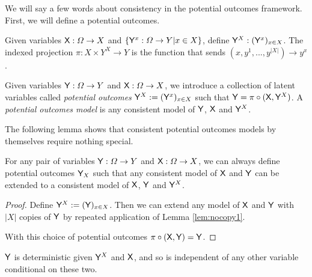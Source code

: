 
We will say a few words about consistency in the potential outcomes framework. First, we will define a potential outcomes.


\begin{definition}[Projection]
Given variables $\mathsf{X}:\Omega\to X$ and $\{\mathsf{Y}^x:\Omega\to Y|x\in X\}$, define $\mathsf{Y}^X:(\mathsf{Y}^x)_{x\in X}$. The indexed projection $\pi:X\times Y^X\to Y$ is the function that sends $(x,y^1,...,y^{|X|})\to y^x$.
\end{definition}

\begin{definition}\label{def:potential_outcomes}
Given variables $\mathsf{Y}:\Omega\to Y$ and $\mathsf{X}:\Omega\to X$, we introduce a collection of latent variables called \emph{potential outcomes} $\mathsf{Y}^X:=(\mathsf{Y}^x)_{x\in X}$ such that $\mathsf{Y} = \pi\circ(\mathsf{X},\mathsf{Y}^X)$. A \emph{potential outcomes model} is any consistent model of $\mathsf{Y}$, $\mathsf{X}$ and $\mathsf{Y}^X$.
\end{definition}

The following lemma shows that consistent potential outcomes models by themselves require nothing special.

\begin{lemma}\label{lem:po_triviality}
For any pair of variables $\mathsf{Y}:\Omega\to Y$ and $\mathsf{X}:\Omega\to X$, we can always define potential outcomes $\mathsf{Y}_X$ such that any consistent model of $\mathsf{X}$ and $\mathsf{Y}$ can be extended to a consistent model of $\mathsf{X}$, $\mathsf{Y}$ and $\mathsf{Y}^X$.
\end{lemma}

\begin{proof}
Define $\mathsf{Y}^X:=(\mathsf{Y})_{x\in X}$. Then we can extend any model of $\mathsf{X}$ and $\mathsf{Y}$ with $|X|$ copies of $\mathsf{Y}$ by repeated application of Lemma \ref{lem:nocopy1}. 

With this choice of potential outcomes $\pi\circ(\mathsf{X},\mathsf{Y})=\mathsf{Y}$.
\end{proof}

$\mathsf{Y}$ is deterministic given $\mathsf{Y}^X$ and $\mathsf{X}$, and so is independent of any other variable conditional on these two.

